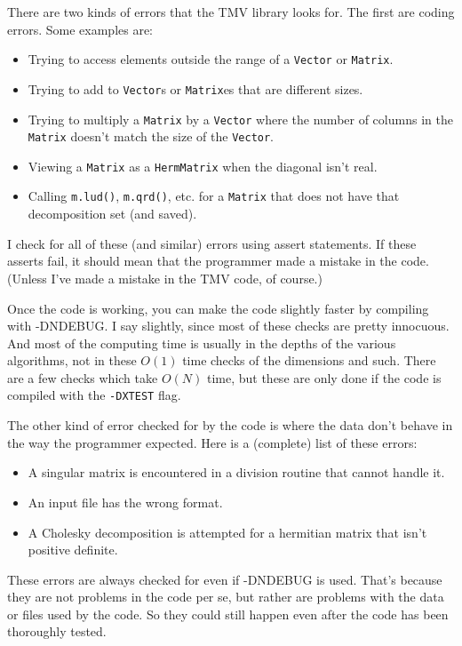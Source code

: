 \documentclass[twoside,letterpaper,11pt]{article}
\renewcommand{\tt}[1]{{\lstinline {#1}}}
\begin{document}
There are two kinds of errors that the TMV library looks for.  The first are 
coding errors.  Some examples are:
\begin{itemize}
\item
Trying to access elements outside the range of a \tt{Vector} or \tt{Matrix}.
\item
Trying to add to \tt{Vector}s or \tt{Matrix}es that are different sizes.
\item
Trying to multiply a \tt{Matrix} by a \tt{Vector} where the number of columns 
in the \tt{Matrix} doesn't match the size of the \tt{Vector}.
\item
Viewing a \tt{Matrix} as a \tt{HermMatrix} when the diagonal isn't real.
\item
Calling \tt{m.lud()}, \tt{m.qrd()}, etc. for a \tt{Matrix} that does not have that 
decomposition set (and saved).
\end{itemize}

I check for all of these (and similar) errors using assert statements.
If these asserts fail, it should mean that
the programmer made a mistake in the code.  (Unless I've made a 
mistake in the TMV code, of course.)

Once the code is working, you can make the code slightly faster by 
compiling with -DNDEBUG.  I say slightly, since most of these checks 
are pretty innocuous.  And most of the computing time is usually in the depths
of the various algorithms, not in these $O(1)$ time checks of the dimensions and such.  
There are a few checks which take $O(N)$ time, but these are only done
if the code is compiled with the \tt{-DXTEST} flag.

The other kind of error checked for by the code is 
where the data don't behave in the way
the programmer expected.  Here is a (complete) list of these errors:
\begin{itemize}
\item
A singular matrix is encountered in a division routine that cannot handle it.
\item
An input file has the wrong format.
\item
A Cholesky decomposition is attempted for a
hermitian matrix that isn't positive definite.
\end{itemize}

These errors are always checked for even if -DNDEBUG is used.
That's because they are not problems in the code per se, but rather
are problems with the data or files used by the code.  So they could
still happen even after the code has been thoroughly tested.
\end{document}
